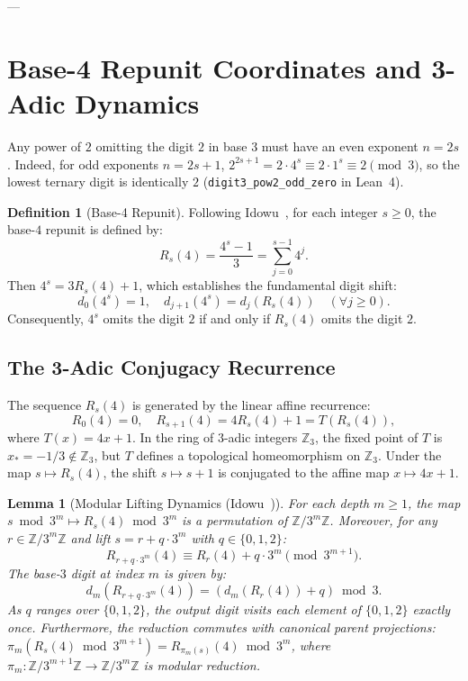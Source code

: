 \documentclass[11pt,reqno]{amsart}
\theoremstyle{plain}
\newtheorem{lemma}[theorem]{Lemma}
\theoremstyle{definition}
\newtheorem{definition}[theorem]{Definition}
\theoremstyle{remark}
\newcommand{\Z}{\mathbb{Z}}
\newcommand{\Zp}{\mathbb{Z}_3}
\begin{document}
---

\section{Base-4 Repunit Coordinates and 3-Adic Dynamics}\label{sec:repunit_dynamics}

Any power of $2$ omitting the digit $2$ in base $3$ must have an even exponent $n = 2s$. Indeed, for odd exponents $n = 2s+1$, $2^{2s+1} = 2 \cdot 4^s \equiv 2 \cdot 1^s \equiv 2 \pmod 3$, so the lowest ternary digit is identically $2$ (\texttt{digit3\_pow2\_odd\_zero} in Lean~4).

\begin{definition}[Base-4 Repunit]
Following Idowu~\cite{Idowu2026}, for each integer $s \ge 0$, the base-$4$ repunit is defined by:
\begin{equation}
R_s(4) = \frac{4^s - 1}{3} = \sum_{j=0}^{s-1} 4^j.
\end{equation}
Then $4^s = 3 R_s(4) + 1$, which establishes the fundamental digit shift:
\begin{equation}
d_0(4^s) = 1, \quad d_{j+1}(4^s) = d_j(R_s(4)) \quad (\forall j \ge 0).
\end{equation}
Consequently, $4^s$ omits the digit $2$ if and only if $R_s(4)$ omits the digit $2$.
\end{definition}

\subsection{The 3-Adic Conjugacy Recurrence}\label{subsec:conjugacy_recurrence}
The sequence $R_s(4)$ is generated by the linear affine recurrence:
\begin{equation}\label{eq:repunit_succ}
R_0(4) = 0, \quad R_{s+1}(4) = 4 R_s(4) + 1 = T(R_s(4)),
\end{equation}
where $T(x) = 4x + 1$. In the ring of $3$-adic integers $\Zp$, the fixed point of $T$ is $x_* = -1/3 \notin \Zp$, but $T$ defines a topological homeomorphism on $\Zp$. Under the map $s \mapsto R_s(4)$, the shift $s \mapsto s + 1$ is conjugated to the affine map $x \mapsto 4x + 1$.

\begin{lemma}[Modular Lifting Dynamics (Idowu~\cite{Idowu2026})]\label{lem:modular_lifting}
For each depth $m \ge 1$, the map $s \bmod 3^m \mapsto R_s(4) \bmod 3^m$ is a permutation of $\Z / 3^m \Z$. Moreover, for any $r \in \Z / 3^m \Z$ and lift $s = r + q \cdot 3^m$ with $q \in \{0, 1, 2\}$:
\begin{equation}
R_{r + q \cdot 3^m}(4) \equiv R_r(4) + q \cdot 3^m \pmod{3^{m+1}}.
\end{equation}
The base-$3$ digit at index $m$ is given by:
\begin{equation}
d_m(R_{r + q \cdot 3^m}(4)) = (d_m(R_r(4)) + q) \bmod 3.
\end{equation}
As $q$ ranges over $\{0, 1, 2\}$, the output digit visits each element of $\{0, 1, 2\}$ exactly once.
Furthermore, the reduction commutes with canonical parent projections: $\pi_m(R_s(4) \bmod 3^{m+1}) = R_{\pi_m(s)}(4) \bmod 3^m$, where $\pi_m : \Z / 3^{m+1}\Z \to \Z / 3^m\Z$ is modular reduction.
\end{lemma}
\end{document}
